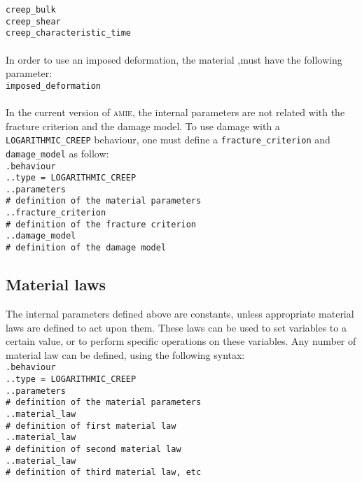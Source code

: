\documentclass[10pt]{article}
\begin{document}
\noindent \verb+creep_bulk+\\
\verb+creep_shear+\\
\verb+creep_characteristic_time+

\paragraph{} In order to use an imposed deformation, the material ,must have the following parameter:\\

\noindent \verb+imposed_deformation+

\paragraph{} In the current version of \textsc{amie}, the internal parameters are not related with the fracture criterion and the damage model. To use damage with a \verb+LOGARITHMIC_CREEP+ behaviour, one must define a \verb+fracture_criterion+ and \verb+damage_model+ as follow:\\

\noindent \verb+.behaviour+\\
\verb+..type = LOGARITHMIC_CREEP+\\
\verb+..parameters+\\
\verb+# definition of the material parameters+\\
\verb+..fracture_criterion+\\
\verb+# definition of the fracture criterion+\\
\verb+..damage_model+\\
\verb+# definition of the damage model+

\subsection{Material laws}

The internal parameters defined above are constants, unless appropriate material laws are defined to act upon them. These laws can be used to set variables to a certain value, or to perform specific operations on these variables. Any number of material law can be defined, using the following syntax:\\

\noindent \verb+.behaviour+\\
\verb+..type = LOGARITHMIC_CREEP+\\
\verb+..parameters+\\
\verb+# definition of the material parameters+\\
\verb+..material_law+\\
\verb+# definition of first material law+\\
\verb+..material_law+\\
\verb+# definition of second material law+\\
\verb+..material_law+\\
\verb+# definition of third material law, etc+
\end{document}
